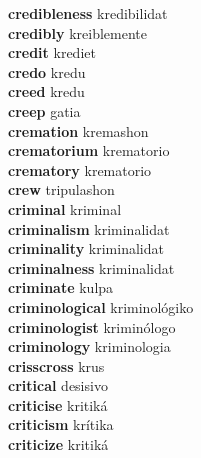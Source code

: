 \textbf{credibleness } kredibilidat \\
\textbf{credibly } kreiblemente \\
\textbf{credit } krediet \\
\textbf{credo } kredu \\
\textbf{creed } kredu \\
\textbf{creep } gatia \\
\textbf{cremation } kremashon \\
\textbf{crematorium } krematorio \\
\textbf{crematory } krematorio \\
\textbf{crew } tripulashon \\
\textbf{criminal } kriminal \\
\textbf{criminalism } kriminalidat \\
\textbf{criminality } kriminalidat \\
\textbf{criminalness } kriminalidat \\
\textbf{criminate } kulpa \\
\textbf{criminological } kriminológiko \\
\textbf{criminologist } kriminólogo \\
\textbf{criminology } kriminologia \\
\textbf{crisscross } krus \\
\textbf{critical } desisivo \\
\textbf{criticise } kritiká \\
\textbf{criticism } krítika \\
\textbf{criticize } kritiká \\
